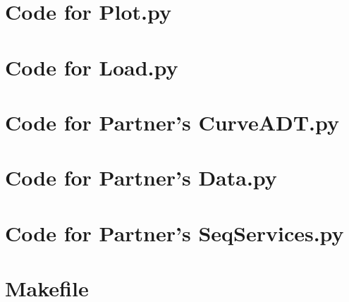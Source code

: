 \documentclass[12pt]{article}
\begin{document}
\noindent 

\newpage

\section{Code for Plot.py}

\noindent 

\newpage

\section{Code for Load.py}

\noindent 

\newpage

\section{Code for Partner's CurveADT.py}

\noindent 

\newpage

\section{Code for Partner's Data.py}

\noindent 

\newpage

\section{Code for Partner's SeqServices.py}


\noindent 

\newpage

\section{Makefile}

\lstset{language=make}
\noindent 
\end{document}
